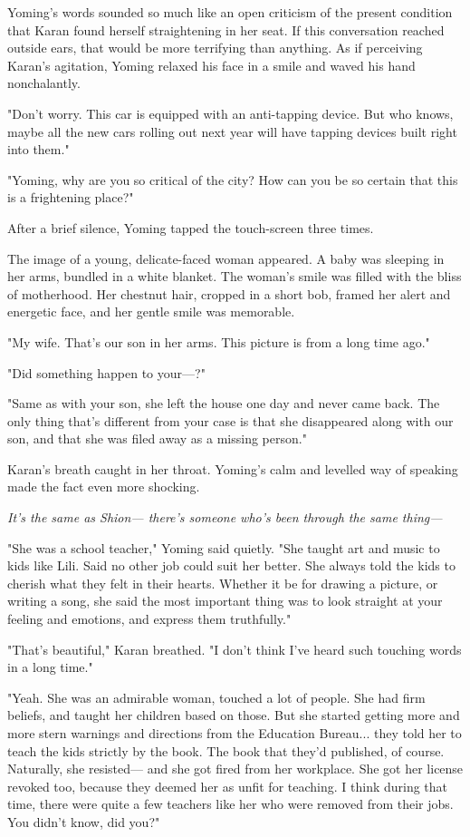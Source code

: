 Yoming's words sounded so much like an open criticism of the present
condition that Karan found herself straightening in her seat. If this
conversation reached outside ears, that would be more terrifying than
anything. As if perceiving Karan's agitation, Yoming relaxed his face in
a smile and waved his hand nonchalantly.

"Don't worry. This car is equipped with an anti-tapping device. But who
knows, maybe all the new cars rolling out next year will have tapping
devices built right into them."

"Yoming, why are you so critical of the city? How can you be so certain
that this is a frightening place?"

After a brief silence, Yoming tapped the touch-screen three times.

The image of a young, delicate-faced woman appeared. A baby was sleeping
in her arms, bundled in a white blanket. The woman's smile was filled
with the bliss of motherhood. Her chestnut hair, cropped in a short bob,
framed her alert and energetic face, and her gentle smile was memorable.

"My wife. That's our son in her arms. This picture is from a long time
ago."

"Did something happen to your---?"

"Same as with your son, she left the house one day and never came back.
The only thing that's different from your case is that she disappeared
along with our son, and that she was filed away as a missing person."

Karan's breath caught in her throat. Yoming's calm and levelled way of
speaking made the fact even more shocking.

\emph{It's the same as Shion--- there's someone who's been through the same
thing---}

"She was a school teacher," Yoming said quietly. "She taught art and
music to kids like Lili. Said no other job could suit her better. She
always told the kids to cherish what they felt in their hearts. Whether
it be for drawing a picture, or writing a song, she said the most
important thing was to look straight at your feeling and emotions, and
express them truthfully."

"That's beautiful," Karan breathed. "I don't think I've heard such
touching words in a long time."

"Yeah. She was an admirable woman, touched a lot of people. She had firm
beliefs, and taught her children based on those. But she started getting
more and more stern warnings and directions from the Education Bureau...
they told her to teach the kids strictly by the book. The book that
they'd published, of course. Naturally, she resisted--- and she got fired
from her workplace. She got her license revoked too, because they deemed
her as unfit for teaching. I think during that time, there were quite a
few teachers like her who were removed from their jobs. You didn't know,
did you?"

